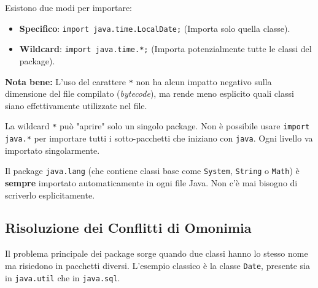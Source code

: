 \begin{observation}
Esistono due modi per importare:
\begin{itemize}
    \item \textbf{Specifico}: \texttt{import java.time.LocalDate;} (Importa solo quella classe).
    \item \textbf{Wildcard}: \texttt{import java.time.*;} (Importa potenzialmente tutte le classi del package).
\end{itemize}
\textbf{Nota bene:} L'uso del carattere \texttt{*} non ha alcun impatto negativo sulla dimensione del file compilato (\textit{bytecode}), ma rende meno esplicito quali classi siano effettivamente utilizzate nel file.
\end{observation}

\begin{important}
    La wildcard \texttt{*} può "aprire" solo un singolo package. Non è possibile usare \texttt{import java.*} per importare tutti i sotto-pacchetti che iniziano con \texttt{java}. Ogni livello va importato singolarmente.
\end{important}

\begin{tip}
    Il package \texttt{java.lang} (che contiene classi base come \texttt{System}, \texttt{String} o \texttt{Math}) è \textbf{sempre} importato automaticamente in ogni file Java. Non c'è mai bisogno di scriverlo esplicitamente.
\end{tip}

\subsection{Risoluzione dei Conflitti di Omonimia}
Il problema principale dei package sorge quando due classi hanno lo stesso nome ma risiedono in pacchetti diversi. L'esempio classico è la classe \texttt{Date}, presente sia in \texttt{java.util} che in \texttt{java.sql}.

